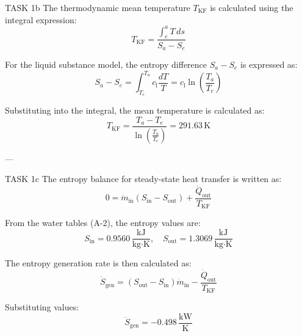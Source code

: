 TASK 1b  
The thermodynamic mean temperature \( T_{\text{KF}} \) is calculated using the integral expression:  
\[
T_{\text{KF}} = \frac{\int_{e}^{a} T \, ds}{S_a - S_e}
\]  

For the liquid substance model, the entropy difference \( S_a - S_e \) is expressed as:  
\[
S_a - S_e = \int_{T_e}^{T_a} c_{\text{l}} \frac{dT}{T} = c_{\text{l}} \ln \left( \frac{T_a}{T_e} \right)
\]  

Substituting into the integral, the mean temperature is calculated as:  
\[
T_{\text{KF}} = \frac{T_a - T_e}{\ln \left( \frac{T_a}{T_e} \right)} = 291.63 \, \text{K}
\]  

---

TASK 1c  
The entropy balance for steady-state heat transfer is written as:  
\[
0 = \dot{m}_{\text{in}} \left( S_{\text{in}} - S_{\text{out}} \right) + \frac{\dot{Q}_{\text{out}}}{T_{\text{KF}}}
\]  

From the water tables (A-2), the entropy values are:  
\[
S_{\text{in}} = 0.9560 \, \frac{\text{kJ}}{\text{kg·K}}, \quad S_{\text{out}} = 1.3069 \, \frac{\text{kJ}}{\text{kg·K}}
\]  

The entropy generation rate is then calculated as:  
\[
\dot{S}_{\text{gen}} = \left( S_{\text{out}} - S_{\text{in}} \right) \dot{m}_{\text{in}} - \frac{\dot{Q}_{\text{out}}}{T_{\text{KF}}}
\]  

Substituting values:  
\[
\dot{S}_{\text{gen}} = -0.498 \, \frac{\text{kW}}{\text{K}}
\]